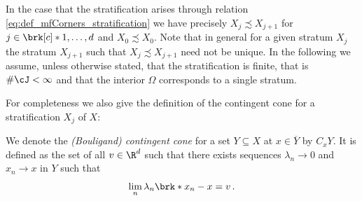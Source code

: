 In the case that the stratification arises through relation \eqref{eq:def_mfCorners_stratification}
we have precisely $X_{j}\precsim X_{j+1}$ for $j\in\brk[c]*{1,\dots,d}$ and $X_0\precsim X_0$.
Note that in general for a given stratum $X_j$ the stratum $X_{j+1}$ such that $X_j\precsim X_{j+1}$ need not be unique.
In the following we assume, unless otherwise stated, that the stratification is finite, that is $\#\cJ<\infty$ and 
that the interior $\Omega$ corresponds to a single stratum.

For completeness we also give the definition of the contingent cone for a 
stratification $X_j$ of $X$:
\begin{definition}
  We denote the \emph{(Bouligand) contingent cone} for a set $Y\subseteq X$ at $x\in\overline{Y}$ by $C_xY$.
  It is defined as the set of all $v\in\R^d$ such that there exists sequences $\lambda_n\to0$ and $x_n\to x$ in
  $Y$ such that
  $$\lim_n\lambda_n\brk*{x_n-x}=v\,.$$
\end{definition}

